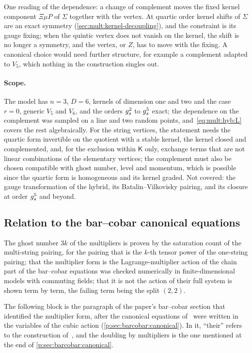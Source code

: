 One reading of the dependence: a change of complement moves the fixed kernel component $\Xi \mu P$ of $\Sigma$ together with the vertex.
At quartic order kernel shifts of $\Sigma$ are an exact symmetry (\cref{sec:mult:kernel-decoupling}), and the constraint is its gauge fixing; when the quintic vertex does not vanish on the kernel, the shift is no longer a symmetry, and the vertex, or $Z$, has to move with the fixing.
A canonical choice would need further structure, for example a complement adapted to $V_5$, which nothing in the construction singles out.

\paragraph{Scope.}
The model has $n = 3$, $D = 6$, kernels of dimension one and two and the case $r = 0$, generic $V_5$ and $V_6$, and the orders $g_s^2$ to $g_s^5$ exact; the dependence on the complement was sampled on a line and two random points, and~\eqref{eq:mult:hyb:L} covers the rest algebraically.
For the string vertices, the statement needs the quartic form invertible on the quotient with a stable kernel, the kernel closed and complemented, and, for the exclusion within $\mathsf K$ only, exchange terms that are not linear combinations of the elementary vertices; the complement must also be chosen compatible with ghost number, level and momentum, which is possible since the quartic form is homogeneous and its kernel graded.
Not covered: the gauge transformation of the hybrid, its Batalin--Vilkovisky pairing, and its closure at order $g_s^5$ and beyond.

\subsection{Relation to the bar--cobar canonical equations}
\label{sec:mult:barcobar}

The ghost number $3 k$ of the multipliers is proven by the saturation count of the multi-string pairing, for the pairing that is the $k$-th tensor power of the one-string pairing; that the multiplier form is the Lagrange-multiplier action of the chain part of the bar--cobar equations was checked numerically in finite-dimensional models with commuting fields; that it is not the action of their full system is shown term by term, the failing term being the split $(2, 2)$.

The following block is the paragraph of the paper's bar--cobar section that identified the multiplier form, after the canonical equations of~\cite{Chiaffrino:2026:UniversalQuadraticField} were written in the variables of the cubic action (\cref{p:sec:barcobar:canonical}).
In it, \enquote{their} refers to the construction of~\cite{Chiaffrino:2026:UniversalQuadraticField}, and the doubling by multipliers is the one mentioned at the end of \cref{p:sec:barcobar:canonical}.


